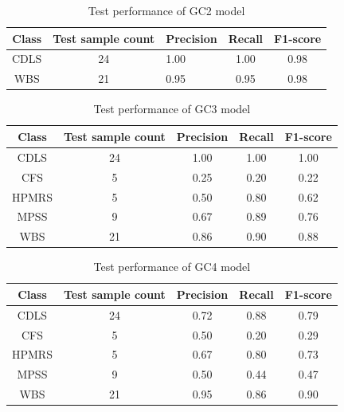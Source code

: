 \documentclass[../report.tex]{subfiles}
\begin{document}
	\begin{table}[H]
		\centering
		\begin{tabular}{|c|c|l|c|c|}
			\hline
			Class & Test sample count & Precision & Recall & F1-score \\ \hline
			CDLS  & 24                & 1.00      & 1.00   & 0.98     \\ \hline
			WBS   & 21                & 0.95      & 0.95   & 0.98     \\ \hline
		\end{tabular}
	\caption{Test performance of GC2 model}
	\end{table}
	\begin{table}[H]
		\centering
		\begin{tabular}{|c|c|c|c|c|}
			\hline
			Class & Test sample count & Precision & Recall & F1-score \\ \hline
			CDLS  & 24                & 1.00      & 1.00   & 1.00     \\ \hline
			CFS   & 5                 & 0.25      & 0.20   & 0.22     \\ \hline
			HPMRS & 5                 & 0.50      & 0.80   & 0.62     \\ \hline
			MPSS  & 9                 & 0.67      & 0.89   & 0.76     \\ \hline
			WBS   & 21                & 0.86      & 0.90   & 0.88     \\ \hline
		\end{tabular}
	\caption{Test performance of GC3 model}
	\end{table}

	\begin{table}[H]
		\centering
		\begin{tabular}{|c|c|c|c|c|}
			\hline
			Class & Test sample count & Precision & Recall & F1-score \\ \hline
			CDLS  & 24                & 0.72      & 0.88   & 0.79     \\ \hline
			CFS   & 5                 & 0.50      & 0.20   & 0.29     \\ \hline
			HPMRS & 5                 & 0.67      & 0.80   & 0.73     \\ \hline
			MPSS  & 9                 & 0.50      & 0.44   & 0.47     \\ \hline
			WBS   & 21                & 0.95      & 0.86   & 0.90     \\ \hline
		\end{tabular}
	\caption{Test performance of GC4 model}
	\end{table}
\end{document}
